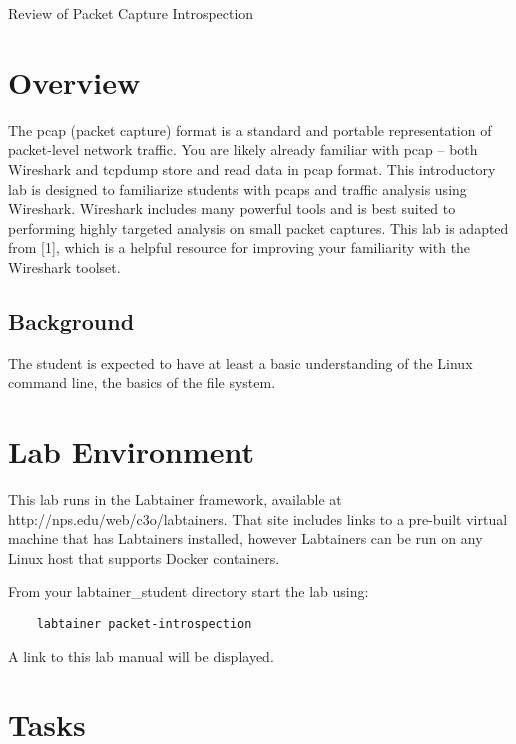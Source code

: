 


\begin{center}
{\LARGE Review of Packet Capture Introspection}
\vspace{0.1in}\\
\end{center}

\section{Overview}
The pcap (packet capture) format is a standard and portable representation of packet-level
network traffic. You are likely already familiar with pcap – both Wireshark and tcpdump
store and read data in pcap format.
This introductory lab is designed to familiarize students with pcaps and traffic analysis
using Wireshark. Wireshark includes many powerful tools and is best suited to performing
highly targeted analysis on small packet captures. This lab is adapted from [1], which is a
helpful resource for improving your familiarity with the Wireshark toolset.

\subsection {Background}
The student is expected to have at least a basic understanding of the Linux command line,
the basics of the file system.

\section{Lab Environment}
This lab runs in the Labtainer framework,
available at http://nps.edu/web/c3o/labtainers.
That site includes links to a pre-built virtual machine
that has Labtainers installed, however Labtainers can
be run on any Linux host that supports Docker containers.

From your labtainer_student directory start the lab using:
\begin{verbatim}
    labtainer packet-introspection
\end{verbatim}
\noindent A link to this lab manual will be displayed.  

\section {Tasks}

